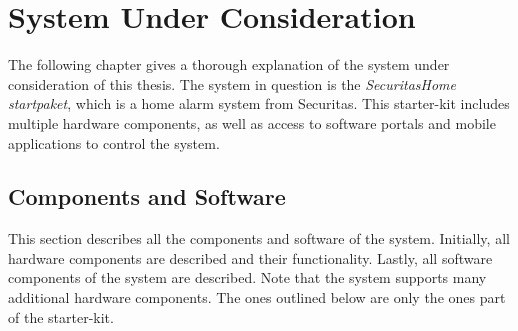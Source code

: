 \chapter{System Under Consideration} \label{ch:system}
The following chapter gives a thorough explanation of the system under consideration of this thesis. The system in question is the \textit{SecuritasHome startpaket}, which is a home alarm system from Securitas. This starter-kit includes multiple hardware components, as well as access to software portals and mobile applications to control the system.

\section{Components and Software} \label{ch:system:components}
This section describes all the components and software of the system. Initially, all hardware components are described and their functionality. Lastly, all software components of the system are described. Note that the system supports many additional hardware components. The ones outlined below are only the ones part of the starter-kit.


